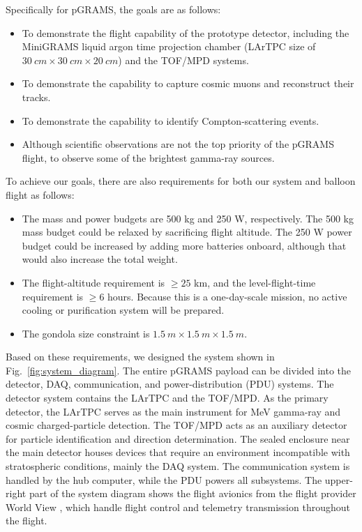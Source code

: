 \noindent Specifically for pGRAMS, the goals are as follows:

\begin{itemize}
    \item To demonstrate the flight capability of the prototype detector, including the MiniGRAMS liquid argon time projection chamber (\ac{LArTPC} size of $30~cm \times 30~cm \times 20~cm$) and the \ac{TOF}/\ac{MPD} systems.
    \item To demonstrate the capability to capture cosmic muons and reconstruct their tracks.
    \item To demonstrate the capability to identify Compton-scattering events.
    \item Although scientific observations are not the top priority of the pGRAMS flight, to observe some of the brightest gamma-ray sources.

\end{itemize}


\noindent To achieve our goals, there are also requirements for both our system and balloon flight as follows:
\begin{itemize}
    \item The mass and power budgets are 500 kg and 250 W, respectively. The 500 kg mass budget could be relaxed by sacrificing flight altitude. The 250 W power budget could be increased by adding more batteries onboard, although that would also increase the total weight.
    \item The flight-altitude requirement is $\geq 25$ km, and the level-flight-time requirement is $\geq 6$ hours. Because this is a one-day-scale mission, no active cooling or purification system will be prepared.
    \item The gondola size constraint is $1.5~m \times 1.5~m \times 1.5~m$.

\end{itemize}

Based on these requirements, we designed the system shown in Fig.~\ref{fig:system_diagram}. The entire pGRAMS payload can be divided into the detector, \ac{DAQ}, communication, and power-distribution (\ac{PDU}) systems. The detector system contains the \ac{LArTPC} and the \ac{TOF}/\ac{MPD}. As the primary detector, the \ac{LArTPC} serves as the main instrument for MeV gamma-ray and cosmic charged-particle detection. The \ac{TOF}/\ac{MPD} acts as an auxiliary detector for particle identification and direction determination. The sealed enclosure near the main detector houses devices that require an environment incompatible with stratospheric conditions, mainly the \ac{DAQ} system. The communication system is handled by the hub computer, while the \ac{PDU} powers all subsystems. The upper-right part of the system diagram shows the flight avionics from the flight provider World View \cite{worldviewspace2025}, which handle flight control and telemetry transmission throughout the flight.

